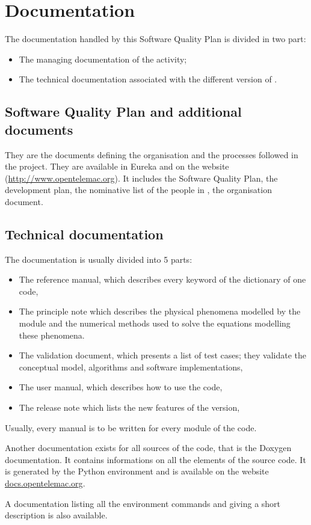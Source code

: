 \chapter{Documentation}

The documentation handled by this Software Quality Plan is divided in two part:
\begin{itemize}
\item The managing documentation of the \telemacsystem activity;
\item The technical documentation associated with the different version of \telemacsystem.
\end{itemize}

\section{Software Quality Plan and additional documents}

They are the documents defining the organisation and the processes followed in the
\telemacsystem project. They are available in Eureka and on the \telemacsystem website
(\url{http://www.opentelemac.org}). It includes the Software Quality Plan, the
development plan, the nominative list of the people in \telemacsystem, the
organisation document.

\section{Technical documentation}

The documentation is usually divided into 5 parts:
\begin{itemize}
\item The reference manual, which describes every keyword of the dictionary of
one code,
\item The principle note which describes the physical phenomena modelled by the
module and the numerical methods used to solve the equations modelling these
phenomena.
\item The validation document, which presents a list of test cases; they
validate the conceptual model, algorithms and software implementations,
\item The user manual, which describes how to use the code,
\item The release note which lists the new features of the version,
\end{itemize}

Usually, every manual is to be written for every module of the code.

Another documentation exists for all sources of the code, that is the Doxygen
documentation. It contains informations on all the elements of the source code.
It is generated by the Python environment and is available on the website
\url{docs.opentelemac.org}.

A documentation listing all the environment commands and giving a short
description is also available.
